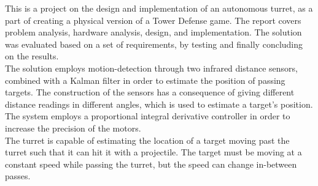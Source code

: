 This is a project on the design and implementation of an autonomous turret, as a part of creating a physical version of a Tower Defense game. The report covers problem analysis, hardware analysis, design, and implementation. The solution was evaluated based on a set of requirements, by testing and finally concluding on the results.\\
    
The solution employs motion-detection through two infrared distance sensors, combined with a Kalman filter in order to estimate the position of passing targets. The construction of the sensors has a consequence of giving different distance readings in different angles, which is used to estimate a target's position. The system employs a proportional integral derivative controller in order to increase the precision of the motors.\\

The turret is capable of estimating the location of a target moving past the turret such that it can hit it with a projectile. The target must be moving at a constant speed while passing the turret, but the speed can change in-between passes.

    
